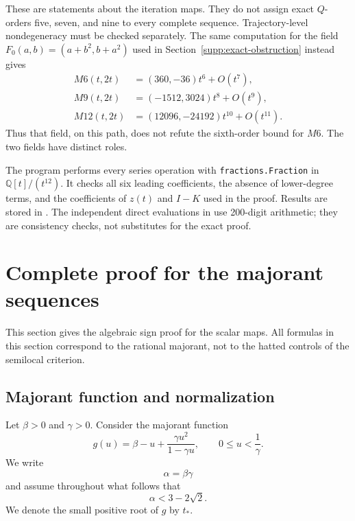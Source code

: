 \documentclass[11pt,a4paper]{article}
\numberwithin{equation}{section}
\numberwithin{table}{section}
\theoremstyle{plain}
\theoremstyle{definition}\newtheorem{definition}[theorem]{Definition}
\theoremstyle{remark}\newtheorem{remark}[theorem]{Remark}
\begin{document}
These are statements about the iteration maps. They do not assign
exact $Q$-orders five, seven, and nine to every complete sequence.
Trajectory-level nondegeneracy must be checked separately.
The same computation for the field $F_0(a,b)=(a+b^2,b+a^2)$ used in
Section~\ref{supp:exact-obstruction} instead gives
\[
\begin{aligned}
 M6(t,2t)&=(360,-36)t^6+O(t^7),\\
 M9(t,2t)&=(-1512,3024)t^8+O(t^9),\\
 M12(t,2t)&=(12096,-24192)t^{10}+O(t^{11}).
\end{aligned}
\]
Thus that field, on this path, does not refute the sixth-order
bound for $M6$. The two fields have distinct roles.

The program  performs every series
operation with \texttt{fractions.Fraction} in
$\mathbb Q[t]/(t^{12})$. It checks all six leading coefficients,
the absence of lower-degree terms, and the coefficients of $z(t)$
and $I-K$ used in the proof. Results are stored in
.
The independent direct evaluations in
 use 200-digit arithmetic;
they are consistency checks, not substitutes for the exact proof.


\section{Complete proof for the majorant sequences}\label{supp:scalar}
This section gives the algebraic sign proof for the scalar maps. All formulas
in this section correspond to the rational majorant, not to the hatted
controls of the semilocal criterion.
\subsection{Majorant function and normalization}

Let $\beta>0$ and $\gamma>0$. Consider the majorant function 
\begin{equation*}
g(u)=\beta-u+\frac{\gamma u^2}{1-\gamma u}, \qquad 0\leq u<\frac1\gamma.
\end{equation*}
We write 
\begin{equation*}
\alpha=\beta\gamma
\end{equation*}
and assume throughout what follows that 
\begin{equation*}
\alpha<3-2\sqrt2.
\end{equation*}
We denote the small positive root of $g$ by $t_*$.
\end{document}
